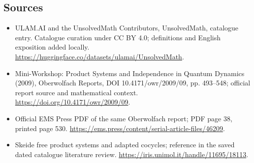 \documentclass[11pt]{article}
\begin{document}
\subsection{Sources}
\begin{itemize}
\item[\hypertarget{source:statement:1}{S1}] ULAM.AI and the UnsolvedMath Contributors, UnsolvedMath, catalogue entry. Catalogue curation under CC BY 4.0; definitions and English exposition added locally.
\url{https://huggingface.co/datasets/ulamai/UnsolvedMath}.
\item[\hypertarget{source:statement:2}{S2}] Mini-Workshop: Product Systems and Independence in Quantum Dynamics (2009), Oberwolfach Reports, DOI 10.4171/owr/2009/09, pp. 493--548; official report source and mathematical context.
\url{https://doi.org/10.4171/owr/2009/09}.
\item[\hypertarget{source:statement:3}{S3}] Official EMS Press PDF of the same Oberwolfach report; PDF page 38, printed page 530.
\url{https://ems.press/content/serial-article-files/46209}.
\item[\hypertarget{source:statement:4}{S4}] Skeide free product systems and adapted cocycles; reference in the saved dated catalogue literature review.
\url{https://iris.unimol.it/handle/11695/18113}.
\end{itemize}
\label{end:statement}
\end{document}
